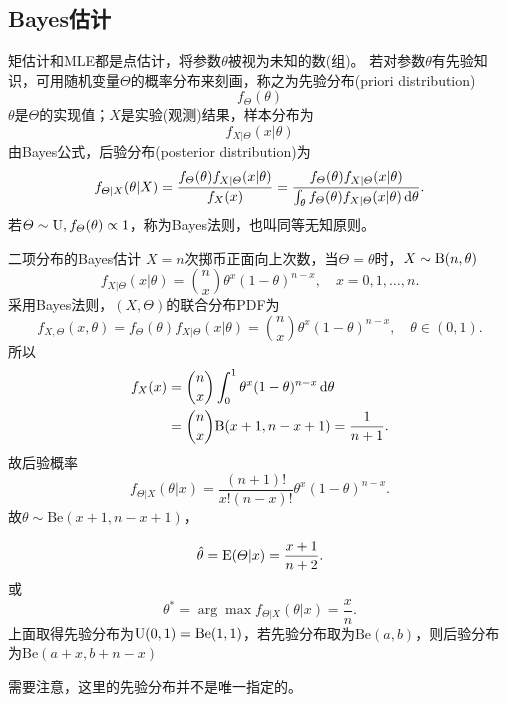 \subsection{Bayes估计}
矩估计和MLE都是点估计，将参数$\theta$被视为未知的数(组)。
若对参数$\theta$有先验知识，可用随机变量$\varTheta$的概率分布来刻画，称之为先验分布(priori distribution)
\[
	f_\varTheta(\theta)
\]
$\theta$是$\varTheta$的实现值；$X$是实验(观测)结果，样本分布为
\[
	f_{X|\varTheta}(x|\theta)
\]
由Bayes公式，后验分布(posterior distribution)为
\begin{align}
	f_{\varTheta|X}(\theta|X)=\frac{f_\varTheta(\theta)f_{X|\varTheta}(x|\theta)}{f_X(x)}=\frac{f_\varTheta(\theta)f_{X|\varTheta}(x|\theta)}{\textstyle\int_\theta f_\varTheta(\theta)f_{X|\varTheta}(x|\theta)\mathop{}\!\mathrm{d}\theta}.
\end{align}
若$\varTheta\sim\operatorname{U},f_\varTheta(\theta)\propto 1$，称为Bayes法则，也叫同等无知原则。
\begin{example}{二项分布的Bayes估计}{}
	$X=n$次掷币正面向上次数，当$\varTheta=\theta$时，$X\sim\operatorname{B}(n,\theta)$
	\[
		f_{X|\varTheta}(x|\theta)={n\choose x}\theta^x(1-\theta)^{n-x},\quad x=0,1,\ldots,n.
	\]
	采用Bayes法则，$(X,\varTheta)$的联合分布PDF为
	\[
		f_{X,\varTheta}(x,\theta)=f_{\varTheta}(\theta)f_{X|\varTheta}(x|\theta)={n\choose x}\theta^x(1-\theta)^{n-x},\quad\theta\in(0,1).
	\]
	所以
	\begin{align*}
		f_X(x)&={n\choose x}\int_0^1\theta^x(1-\theta)^{n-x}\mathop{}\!\mathrm{d}\theta\\
		&={n\choose x}\mathrm B(x+1,n-x+1)=\frac1{n+1}.
	\end{align*}
	故后验概率
	\[
		f_{\varTheta|X}(\theta|x)=\frac{(n+1)!}{x!(n-x)!}\theta^x(1-\theta)^{n-x}.
	\]
	故$\theta\sim\mathrm{Be}(x+1,n-x+1)$，
	
	\[
		\hat\theta=\operatorname{E}(\varTheta|x)=\frac{x+1}{n+2}.
	\]
	或
	\[
		\theta^\ast=\arg\max f_{\varTheta|X}(\theta|x)=\frac xn.
	\]
	\tcblower
	上面取得先验分布为$\operatorname{U}(0,1)=\mathrm{Be}(1,1)$，若先验分布取为$\mathrm{Be}(a,b)$，则后验分布为$\mathrm{Be}(a+x,b+n-x)$
\end{example}
需要注意，这里的先验分布并不是唯一指定的。
